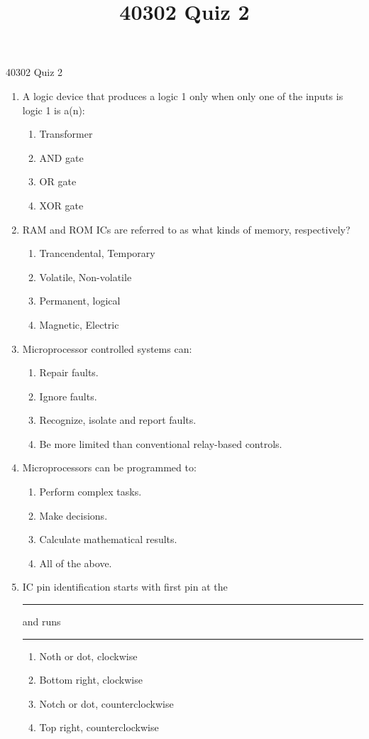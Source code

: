 \documentclass[10pt]{article}
\title{40302 Quiz 2}
\date{}
\begin{document}
40302 Quiz 2
\begin{multicols}{2}
\begin{enumerate}
\item A logic device that produces a logic 1 only when only one of the inputs is logic 1 is a(n):
	\begin{enumerate}
	\item Transformer
	\item AND gate
	\item OR gate
	\item XOR gate
	\end{enumerate}
\item RAM and ROM ICs are referred to as what kinds of memory, respectively?
	\begin{enumerate}
	\item Trancendental, Temporary
	\item Volatile, Non-volatile
	\item Permanent, logical
	\item Magnetic, Electric
	\end{enumerate}
\item Microprocessor controlled systems can:
	\begin{enumerate}
	\item Repair faults.
	\item Ignore faults.
	\item Recognize, isolate and report faults.
	\item Be more limited than conventional relay-based controls.
	\end{enumerate}
\item Microprocessors can be programmed to:
	\begin{enumerate}
	\item Perform complex tasks.
	\item Make decisions.
	\item Calculate mathematical results.
	\item All of the above.
	\end{enumerate}
\item IC pin identification starts with first pin at the \rule{1cm}{0.15mm} and runs \rule{1cm}{0.15mm}
	\begin{enumerate}
	\item Noth or dot, clockwise
	\item Bottom right, clockwise
	\item Notch or dot, counterclockwise
	\item Top right, counterclockwise

\end{enumerate}
\end{enumerate}
\end{multicols}
\end{document}
